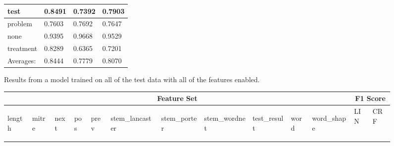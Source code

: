 \documentclass[preprint]{style}
\begin{document}
\begin{figure}[t]
\begin{center}
\begin{tabular}{|l|l|l|l|}
     test & 0.8491 &	0.7392	& 0.7903 \\ \hline
  problem & 0.7603 &	0.7692 &	0.7647 \\ \hline
     none & 0.9395	 & 0.9668	& 0.9529 \\ \hline
treatment & 0.8289 &	0.6365 &	0.7201\\ \hline

	\hline
	Averages: & 0.8444 &	 0.7779  & 	0.8070 \\
	\hline
	\end{tabular}
\end{center}

\caption{Results from a model trained on all of the test data with all of the features enabled.}
\label{fig:all_features_results}
\end{figure}

\begin{figure}

\begin{center}
	\begin{tabular}{|l|l|l|l|l|l|l|l|l|l|l||l|l|}
	\hline
	\multicolumn{11}{|c||}{\bf Feature Set} & \multicolumn{2}{|c|}{\bf F1 Score}	\\ \hline
		\begin{sideways} length \end{sideways} & 
		\begin{sideways} mitre \end{sideways} & 
		\begin{sideways} next \end{sideways} & 
		\begin{sideways} pos \end{sideways} & 
		\begin{sideways} prev \end{sideways} & 
		\begin{sideways} stem\_lancaster \end{sideways} & 
		\begin{sideways} stem\_porter \end{sideways} & 
		\begin{sideways} stem\_wordnet \end{sideways} & 
		\begin{sideways} test\_result \end{sideways} & 
		\begin{sideways} word \end{sideways} & 
		\begin{sideways} word\_shape \end{sideways} & 
		LIN & CRF	\\ \hline


\end{tabular}
\end{center}
\end{figure}
\end{document}
